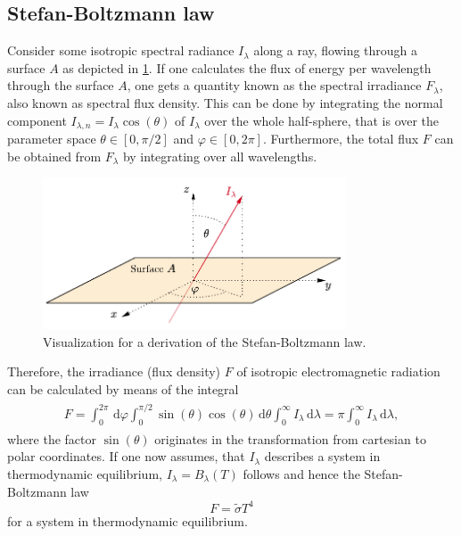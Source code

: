 \documentclass[a4paper,11pt]{report}
\begin{document}
\subsection{Stefan-Boltzmann law}
Consider some isotropic spectral radiance $I_\lambda$ along a ray, flowing through a surface $A$ as depicted in \cref{fig:isotropicrad}. If one calculates the flux of energy per wavelength through the surface $A$, one gets a quantity known as the spectral irradiance $F_\lambda$, also known as spectral flux density. This can be done by integrating the normal component $I_{\lambda,n} = I_\lambda \cos(\theta)$ of $I_\lambda$ over the whole half-sphere, that is over the parameter space $\theta \in [0,\pi/2]$ and $\varphi \in [0,2\pi]$. Furthermore, the total flux $F$ can be obtained from $F_\lambda$ by integrating over all wavelengths.
\begin{figure}[h]
\centering
\includegraphics[width=9cm]{figures/isotropicrad.pdf}
\caption{Visualization for a derivation of the Stefan-Boltzmann law.}
\label{fig:isotropicrad}
\end{figure}
Therefore, the irradiance (flux density) $F$ of isotropic electromagnetic radiation can be calculated by means of the integral \begin{align}
\begin{aligned}
F = \int_{0}^{2\pi}\,\mathrm{d}\varphi \int_{0}^{\pi/2}\sin(\theta)\cos(\theta)\,\mathrm{d}\theta \int_{0}^{\infty}I_\lambda\,\mathrm{d}\lambda = \pi\int_{0}^{\infty}I_\lambda\,\mathrm{d}\lambda,
\end{aligned}
\end{align} where the factor $\sin(\theta)$ originates in the transformation from cartesian to polar coordinates. If one now assumes, that $I_\lambda$ describes a system in thermodynamic equilibrium, $I_\lambda = B_\lambda(T)$ follows and hence the Stefan-Boltzmann law \begin{equation}
F = \tilde{\sigma}T^4
\end{equation} for a system in thermodynamic equilibrium.
\end{document}

